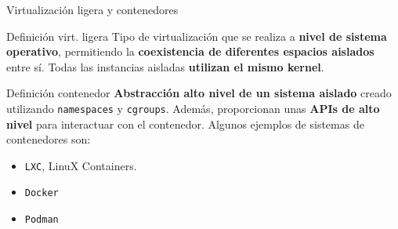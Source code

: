 \documentclass[aspectratio=169,xcolor=dvipsnames]{beamer}
\begin{document}
	\begin{frame}{Virtualización ligera y contenedores}
		\begin{block}{Definición virt. ligera}
		    Tipo de virtualización que se realiza a \textbf{nivel de sistema operativo}, permitiendo la \textbf{coexistencia de diferentes espacios aislados} entre sí. Todas las instancias aisladas \textbf{utilizan el mismo kernel}. 
		\end{block}
		
		\begin{block}{Definición contenedor}
		    \textbf{Abstracción alto nivel de un sistema aislado} creado utilizando \texttt{namespaces} y \texttt{cgroups}. Además, proporcionan unas \textbf{APIs de alto nivel} para interactuar con el contenedor. Algunos ejemplos de sistemas de contenedores son:
		    
		    \begin{itemize}
		        \item \texttt{LXC}, LinuX Containers.
		        \item \texttt{Docker}
		        \item \texttt{Podman}
		    \end{itemize}
		\end{block}
	\end{frame}
	
\end{document}
